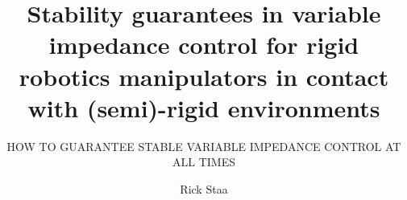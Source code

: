 \documentclass{layout/tudelft-report}
\begin{document}
\frontmatter

\title{Stability guarantees in variable impedance control for rigid robotics manipulators in contact with (semi)-rigid environments}
\subtitle{HOW TO GUARANTEE STABLE VARIABLE IMPEDANCE CONTROL AT ALL TIMES}
\author{Rick Staa}
\subject{ME51010: ME-BMD Literature Report}



\makecover


% 


\tableofcontents
\listoffigures
\listoftables
{}



\mainmatter










\setcounter{biburlnumpenalty}{7000}
\setcounter{biburllcpenalty}{7000}
\setcounter{biburlucpenalty}{7000}

\printbibliography[heading=bibintoc,title=References]

\appendix


\end{document}
